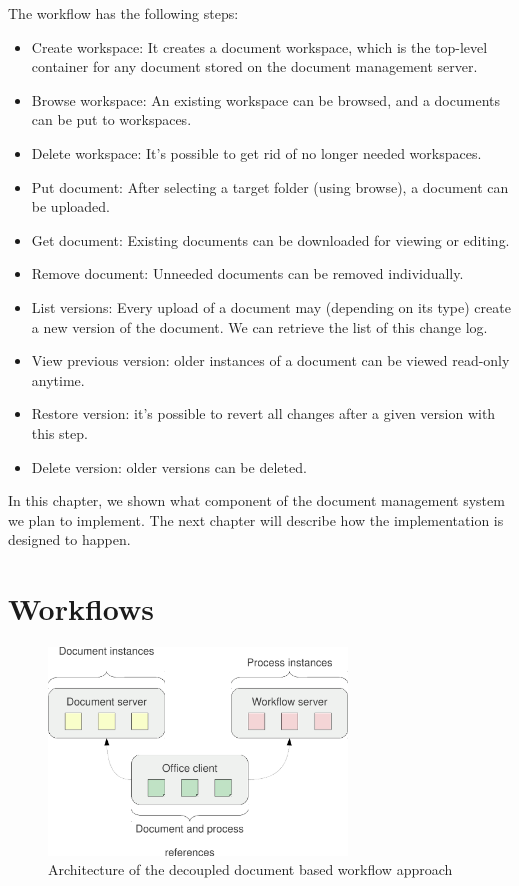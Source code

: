 The workflow has the following steps:

\begin{itemize}
\item Create workspace: It creates a document workspace, which is the top-level
container for any document stored on the document management server.
\item Browse workspace: An existing workspace can be browsed, and a documents
can be put to workspaces.
\item Delete workspace: It's possible to get rid of no longer needed workspaces.
\item Put document: After selecting a target folder (using browse), a document
can be uploaded.
\item Get document: Existing documents can be downloaded for viewing or editing.
\item Remove document: Unneeded documents can be removed individually.
\item List versions: Every upload of a document may (depending on its type)
create a new version of the document. We can retrieve the list of this change log.
\item View previous version: older instances of a document can be viewed
read-only anytime.
\item Restore version: it's possible to revert all changes after a given
version with this step.
\item Delete version: older versions can be deleted.
\end{itemize}

In this chapter, we shown what component of the document management system we
plan to implement. The next chapter will describe how the implementation is
designed to happen.

\section{Workflows}

\begin{figure}[H]
\centering
\includegraphics[width=300px,keepaspectratio]{decoupled-approach.pdf}
\caption{Architecture of the decoupled document based workflow approach}
\label{fig:decoupled-approach}
\end{figure}

